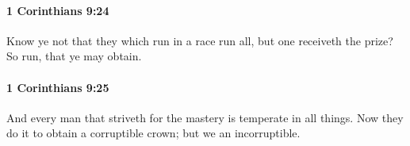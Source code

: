		\paragraph{1 Corinthians 9:24} %
			\label{1CORINTHIANS-9-24}

			Know ye not that they which run in a race run all, but one receiveth the prize?  So run, that ye may obtain.

			\begin{framed}
			\scriptsize
				\begin{compactdesc}
					\item[SBLG] 
				\end{compactdesc}
			\end{framed}

		\paragraph{1 Corinthians 9:25} %
			\label{1CORINTHIANS-9-25}

			And every man that striveth for the mastery is temperate in all things.  Now they do it to obtain a corruptible crown; but we an incorruptible.

